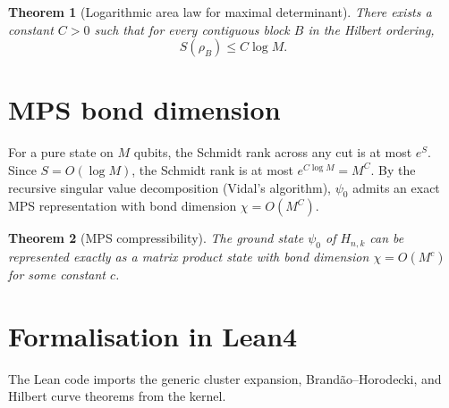 \documentclass[11pt,a4paper]{article}
\newtheorem{theorem}{Theorem}[section]
\begin{document}
\begin{theorem}[Logarithmic area law for maximal determinant]\label{thm:logarea}
There exists a constant $C>0$ such that for every contiguous block $B$ in the Hilbert ordering,
\[
S(\rho_B) \le C \log M.
\]
\end{theorem}

\section{MPS bond dimension}

For a pure state on $M$ qubits, the Schmidt rank across any cut is at most $e^{S}$. Since $S = O(\log M)$, the Schmidt rank is at most $e^{C\log M} = M^{C}$. By the recursive singular value decomposition (Vidal's algorithm), $\psi_0$ admits an exact MPS representation with bond dimension $\chi = O(M^{C})$.

\begin{theorem}[MPS compressibility]\label{thm:mps}
The ground state $\psi_0$ of $H_{n,k}$ can be represented exactly as a matrix product state with bond dimension $\chi = O(M^c)$ for some constant $c$.
\end{theorem}

\section{Formalisation in Lean4}

The Lean code imports the generic cluster expansion, Brandão–Horodecki, and Hilbert curve theorems from the kernel.
\end{document}
